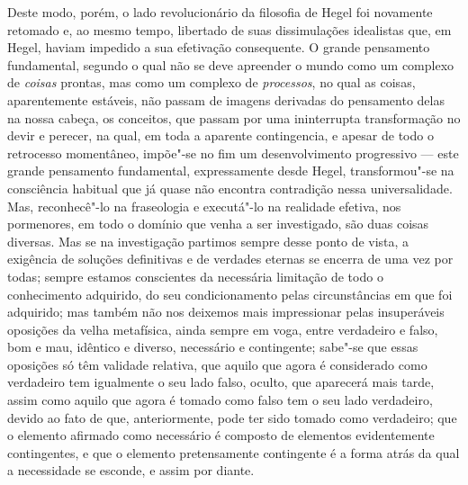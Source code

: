 Deste modo, porém, o lado revolucionário da filosofia
de Hegel foi
novamente retomado e, ao mesmo tempo, libertado de suas dissimulações
idealistas que,
em Hegel,
haviam impedido a sua efetivação consequente. O grande pensamento
fundamental, segundo o qual não se deve apreender o mundo como um
complexo de \emph{coisas }prontas, mas como um complexo
de \emph{processos}, no qual as coisas, aparentemente estáveis, não
passam de imagens derivadas do pensamento delas na nossa cabeça, os
conceitos, que passam por uma ininterrupta transformação no devir e perecer,
na qual, em toda a aparente contingencia, e apesar de todo o retrocesso
momentâneo, impõe"-se no fim um desenvolvimento progressivo --- este grande
pensamento fundamental, expressamente
desde Hegel,
transformou"-se na consciência habitual que já quase não encontra
contradição nessa universalidade. Mas, reconhecê"-lo na fraseologia e
executá"-lo na realidade efetiva, nos pormenores, em todo o domínio que
venha a ser investigado, são duas coisas diversas. Mas se na
investigação partimos sempre desse ponto de vista,
 a exigência de soluções definitivas e de
verdades eternas se encerra de uma vez por todas; sempre estamos
conscientes da necessária limitação de todo o conhecimento adquirido, do
seu condicionamento pelas circunstâncias em que foi adquirido; mas
também não nos deixemos mais impressionar pelas insuperáveis oposições da velha
metafísica, ainda sempre em voga, entre verdadeiro e falso, bom e mau,
idêntico e diverso, necessário e contingente; sabe"-se que essas
oposições só têm validade relativa, que aquilo que agora é considerado
como verdadeiro tem igualmente o seu lado falso, oculto, que aparecerá
mais tarde, assim como aquilo que agora é tomado como falso tem o seu
lado verdadeiro, devido ao fato de que, anteriormente, pode ter sido
tomado como verdadeiro; que o elemento afirmado como necessário é
composto de elementos evidentemente contingentes, e que o elemento
pretensamente contingente é a forma atrás da qual a necessidade se
esconde, e assim por diante.

